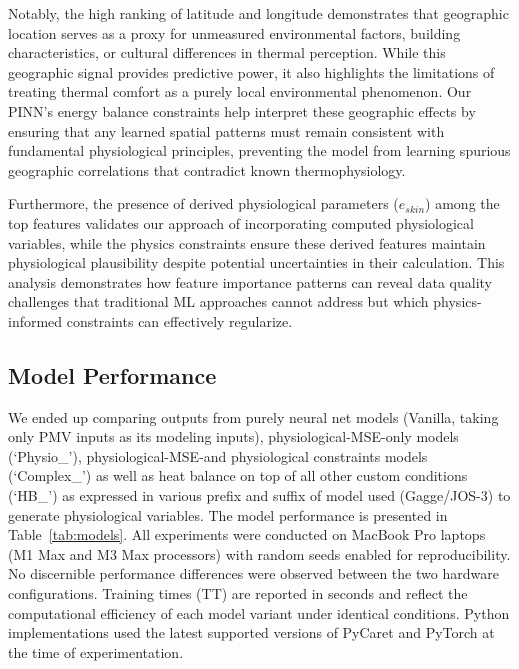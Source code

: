 Notably, the high ranking of latitude and longitude demonstrates that geographic location serves as a proxy for unmeasured environmental factors, building characteristics, or cultural differences in thermal perception. While this geographic signal provides predictive power, it also highlights the limitations of treating thermal comfort as a purely local environmental phenomenon. Our PINN's energy balance constraints help interpret these geographic effects by ensuring that any learned spatial patterns must remain consistent with fundamental physiological principles, preventing the model from learning spurious geographic correlations that contradict known thermophysiology.

Furthermore, the presence of derived physiological parameters ($e_{skin}$) among the top features validates our approach of incorporating computed physiological variables, while the physics constraints ensure these derived features maintain physiological plausibility despite potential uncertainties in their calculation. This analysis demonstrates how feature importance patterns can reveal data quality challenges that traditional ML approaches cannot address but which physics-informed constraints can effectively regularize.

\subsection{Model Performance}

We ended up comparing outputs from purely neural net models (Vanilla, taking only PMV inputs as its modeling inputs), physiological-MSE-only models (`Physio\_'), physiological-MSE-and physiological constraints models (`Complex\_') as well as heat balance on top of all other custom conditions (`HB\_') as expressed in various prefix and suffix of model used (Gagge/JOS-3) to generate physiological variables. The model performance is presented in Table~\ref{tab:models}. All experiments were conducted on MacBook Pro laptops (M1 Max and M3 Max processors) with random seeds enabled for reproducibility. No discernible performance differences were observed between the two hardware configurations. Training times (TT) are reported in seconds and reflect the computational efficiency of each model variant under identical conditions. Python implementations used the latest supported versions of PyCaret and PyTorch at the time of experimentation.

